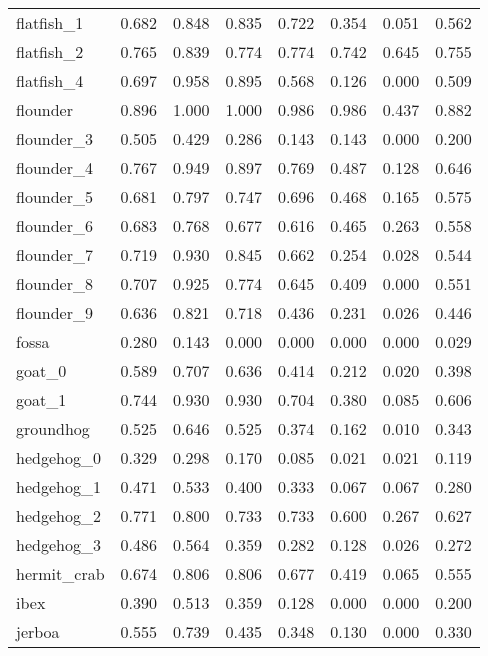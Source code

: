 \begin{table*}[]
\begin{tabular}{l|c|cccccc}
flatfish\_1 & 0.682 & 0.848 & 0.835 & 0.722 & 0.354 & 0.051 & 0.562 \\
flatfish\_2 & 0.765 & 0.839 & 0.774 & 0.774 & 0.742 & 0.645 & 0.755 \\
flatfish\_4 & 0.697 & 0.958 & 0.895 & 0.568 & 0.126 & 0.000 & 0.509 \\
flounder & 0.896 & 1.000 & 1.000 & 0.986 & 0.986 & 0.437 & 0.882 \\
flounder\_3 & 0.505 & 0.429 & 0.286 & 0.143 & 0.143 & 0.000 & 0.200 \\
flounder\_4 & 0.767 & 0.949 & 0.897 & 0.769 & 0.487 & 0.128 & 0.646 \\
flounder\_5 & 0.681 & 0.797 & 0.747 & 0.696 & 0.468 & 0.165 & 0.575 \\
flounder\_6 & 0.683 & 0.768 & 0.677 & 0.616 & 0.465 & 0.263 & 0.558 \\
flounder\_7 & 0.719 & 0.930 & 0.845 & 0.662 & 0.254 & 0.028 & 0.544 \\
flounder\_8 & 0.707 & 0.925 & 0.774 & 0.645 & 0.409 & 0.000 & 0.551 \\
flounder\_9 & 0.636 & 0.821 & 0.718 & 0.436 & 0.231 & 0.026 & 0.446 \\
fossa & 0.280 & 0.143 & 0.000 & 0.000 & 0.000 & 0.000 & 0.029 \\
goat\_0 & 0.589 & 0.707 & 0.636 & 0.414 & 0.212 & 0.020 & 0.398 \\
goat\_1 & 0.744 & 0.930 & 0.930 & 0.704 & 0.380 & 0.085 & 0.606 \\
groundhog & 0.525 & 0.646 & 0.525 & 0.374 & 0.162 & 0.010 & 0.343 \\
hedgehog\_0 & 0.329 & 0.298 & 0.170 & 0.085 & 0.021 & 0.021 & 0.119 \\
hedgehog\_1 & 0.471 & 0.533 & 0.400 & 0.333 & 0.067 & 0.067 & 0.280 \\
hedgehog\_2 & 0.771 & 0.800 & 0.733 & 0.733 & 0.600 & 0.267 & 0.627 \\
hedgehog\_3 & 0.486 & 0.564 & 0.359 & 0.282 & 0.128 & 0.026 & 0.272 \\
hermit\_crab & 0.674 & 0.806 & 0.806 & 0.677 & 0.419 & 0.065 & 0.555 \\
ibex & 0.390 & 0.513 & 0.359 & 0.128 & 0.000 & 0.000 & 0.200 \\
jerboa & 0.555 & 0.739 & 0.435 & 0.348 & 0.130 & 0.000 & 0.330
\end{tabular}
\label{tab:moca2}
\end{table*}

